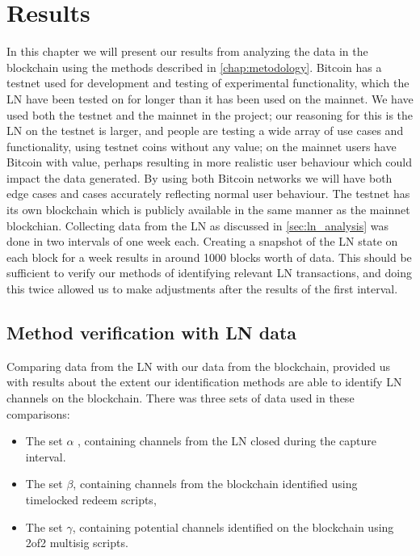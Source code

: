 \chapter{Results}
\label{chap:results}

In this chapter we will present our results from analyzing the data in the blockchain using the methods described in \cref{chap:metodology}. 
Bitcoin has a testnet used for development and testing of experimental functionality, which the LN have been tested on for longer than it has been used on the mainnet. We have used both the testnet and the mainnet in the project; our reasoning for this is the LN on the testnet is larger, and people are testing a wide array of use cases and functionality, using testnet coins without any value; on the mainnet users have Bitcoin with value, perhaps resulting in more realistic user behaviour which could impact the data generated.
By using both Bitcoin networks we will have both edge cases and cases accurately reflecting normal user behaviour.
The testnet has its own blockchain which is publicly available in the same manner as the mainnet blockchian. Collecting data from the LN as discussed in \cref{sec:ln_analysis} was done in two intervals of one week each.
Creating a snapshot of the LN state on each block for a week results in around 1000 blocks worth of data. This should be sufficient to verify our methods of identifying relevant LN transactions, and doing this twice allowed us to make adjustments after the results of the first interval. 

\section{Method verification with LN data}
\label{sec:method_verification}

Comparing data from the LN with our data from the blockchain, provided us with results about the extent our identification methods are able to identify LN channels on the blockchain. There was three sets of data used in these comparisons: 
\begin{itemize}
    \item The set \( \alpha \) , containing channels from the LN closed during the capture interval. 
    \item The set \( \beta \), containing channels from the blockchain identified using timelocked redeem scripts,
    \item The set  \( \gamma \), containing potential channels identified on the blockchain using 2of2 multisig scripts.
\end{itemize}


